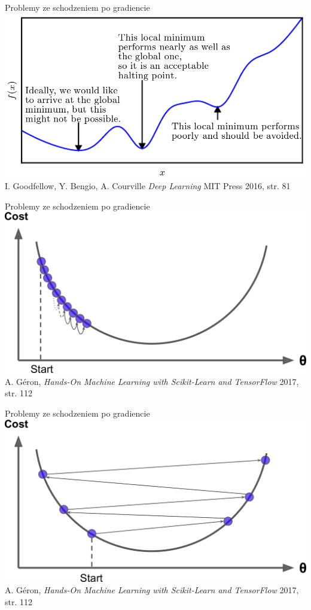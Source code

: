\documentclass{sa}
\begin{document}
\begin{frame}{Problemy ze schodzeniem po gradiencie}
\centering
\includegraphics[width=\textwidth]{grad-problemy.png}
{\vfill\footnotesize I. Goodfellow, Y. Bengio, A. Courville \emph{Deep Learning} MIT Press 2016, str. 81}
\end{frame}

\begin{frame}{Problemy ze schodzeniem po gradiencie}
\centering
\includegraphics[width=.95\textwidth]{grad-e-toosmall.png}
{\vfill\footnotesize A. Géron, \emph{Hands-On Machine Learning with Scikit-Learn and TensorFlow} 2017, str. 112}
\end{frame}

\begin{frame}{Problemy ze schodzeniem po gradiencie}
\centering
\includegraphics[width=.95\textwidth]{grad-e-toolarge.png}
{\vfill\footnotesize A. Géron, \emph{Hands-On Machine Learning with Scikit-Learn and TensorFlow} 2017, str. 112}
\end{frame}
\end{document}
